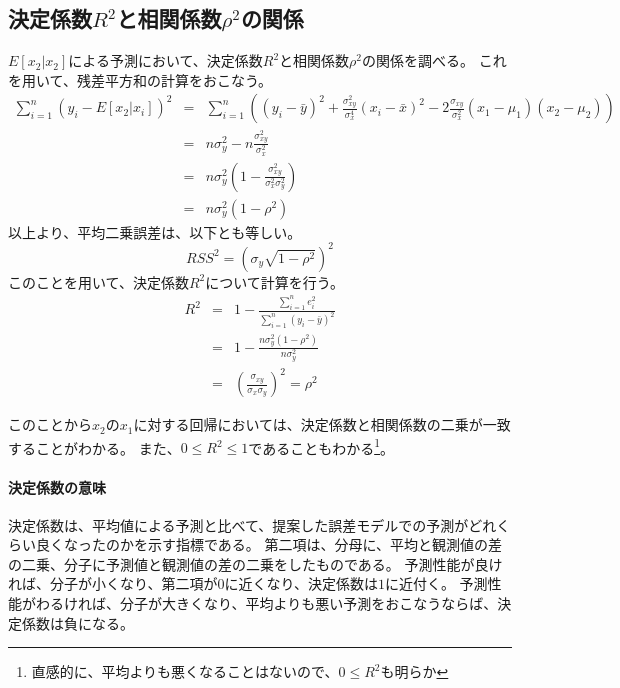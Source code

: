 \subsection{決定係数$R^2$と相関係数$\rho^2$の関係}
$E[x_2|x_2]$による予測において、決定係数$R^2$と相関係数$\rho^2$の関係を調べる。
これを用いて、残差平方和の計算をおこなう。
\begin{eqnarray*}
 \sum_{i=1}^n (y_i-E[x_2|x_i])^2 &=&   \sum_{i=1}^n ((y_i-\bar{y})^2+\frac{\sigma^2_{xy}}{\sigma^4_x}(x_i-\bar{x})^2-2\frac{\sigma_{xy}}{\sigma^2_x}(x_1-\mu_1)(x_2-\mu_2))\\
 &=& n\sigma^2_y -n \frac{\sigma^2_{xy}}{\sigma_x^2} \\
 &=& n\sigma_y^2(1-\frac{\sigma^2_{xy}}{\sigma^2_x\sigma_y^2}) \\
 &=& n\sigma_y^2(1-\rho^2)
\end{eqnarray*}
以上より、平均二乗誤差は、以下とも等しい。
\begin{equation*}
 RSS^2 = (\sigma_y\sqrt{1-\rho^2})^2
\end{equation*}
このことを用いて、決定係数$R^2$について計算を行う。
\begin{eqnarray*}
 R^2 &=& 1-\frac{\sum_{i=1}^n e_i^2}{\sum_{i=1}^n (y_i-\bar{y})^2} \\
 &=& 1-\frac{n\sigma_y^2(1-\rho^2)}{n\sigma^2_y} \\
 &=& \left( \frac{\sigma_{xy}}{\sigma_x\sigma_y}\right)^2 = \rho^2
\end{eqnarray*}

このことから$x_2$の$x_1$に対する回帰においては、決定係数と相関係数の二乗が一致することがわかる。
また、$0\leq R^2\leq 1$であることもわかる\footnote{直感的に、平均よりも悪くなることはないので、$0\leq R^2$も明らか}。

\paragraph{決定係数の意味}
決定係数は、平均値による予測と比べて、提案した誤差モデルでの予測がどれくらい良くなったのかを示す指標である。
第二項は、分母に、平均と観測値の差の二乗、分子に予測値と観測値の差の二乗をしたものである。
予測性能が良ければ、分子が小くなり、第二項が$0$に近くなり、決定係数は$1$に近付く。
予測性能がわるければ、分子が大きくなり、平均よりも悪い予測をおこなうならば、決定係数は負になる。


